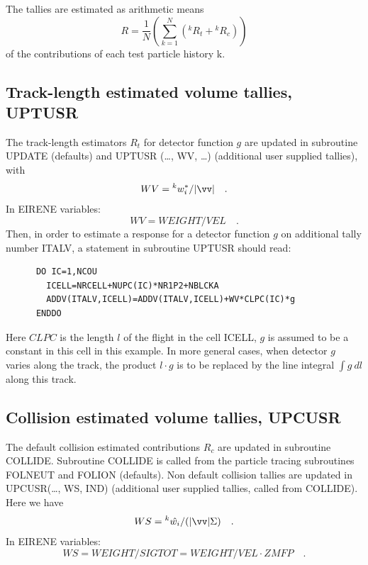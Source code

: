 The tallies are estimated as arithmetic means
\begin{equation}
  R = \frac{1}{N}
  \left ( \sum_{k=1}^{N} (^k{R_t}  +	{^k{R_c}} ) \right )
\end{equation}
of
the contributions of each test particle history k.

\subsection{Track-length estimated volume tallies, UPTUSR}\label{sec3.2.1}

The track-length estimators $R_t$ for detector function $g$ are updated in
subroutine UPDATE (defaults) and UPTUSR (\dots, WV, \dots) (additional user
supplied tallies), with
\begin{displaymath}
  WV = {^k{w_{i}^{*}}} /   | \vv |
  \quad .
\end{displaymath}
In EIRENE variables:
\begin{displaymath}
  WV = WEIGHT/VEL  \quad .
\end{displaymath}
Then, in order to estimate a response for a detector function $g$ on additional
tally number ITALV, a statement in subroutine UPTUSR should read:

\begin{lstlisting}
      DO IC=1,NCOU
        ICELL=NRCELL+NUPC(IC)*NR1P2+NBLCKA
        ADDV(ITALV,ICELL)=ADDV(ITALV,ICELL)+WV*CLPC(IC)*g
      ENDDO
\end{lstlisting}

Here $CLPC$ is the length $l$ of the flight in the cell ICELL, $g$ is assumed
to be a constant in this cell in this example.
In more general cases, when detector $g$ varies along the track, the product $l
  \cdot g$ is to be replaced by the line integral $\int g~ dl$ along this track.

\subsection{Collision estimated volume tallies, UPCUSR}\label{sec3.2.2}

The default collision estimated contributions $R_c$ are updated in subroutine
COLLIDE.
Subroutine COLLIDE is called from the particle tracing subroutines FOLNEUT and
FOLION (defaults).
Non default collision tallies are updated in UPCUSR(\dots, WS, IND) (additional
user supplied tallies, called from COLLIDE).
Here we have
\begin{displaymath}
  WS = {^k{\hat{w_i}}} /   ( | \vv |  \Sigma )
  \quad .
\end{displaymath}
In EIRENE variables:
\begin{displaymath}
  WS = WEIGHT/SIGTOT = WEIGHT/VEL \cdot ZMFP \quad .
\end{displaymath}

